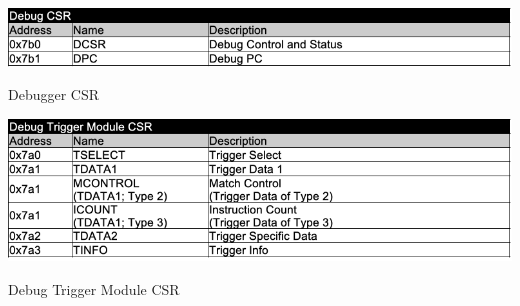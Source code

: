 \begin{table}[H]
    \includegraphics[width=1.00\columnwidth]{./Table/CSR_DEBUG.png}
    \caption{Debugger CSR}
    \label{tb:CSR_DEBUG}
\end{table}

\begin{table}[H]
    \includegraphics[width=1.00\columnwidth]{./Table/CSR_TRIGGER.png}
    \caption{Debug Trigger Module CSR}
    \label{tb:CSR_TRIGGER}
\end{table}
